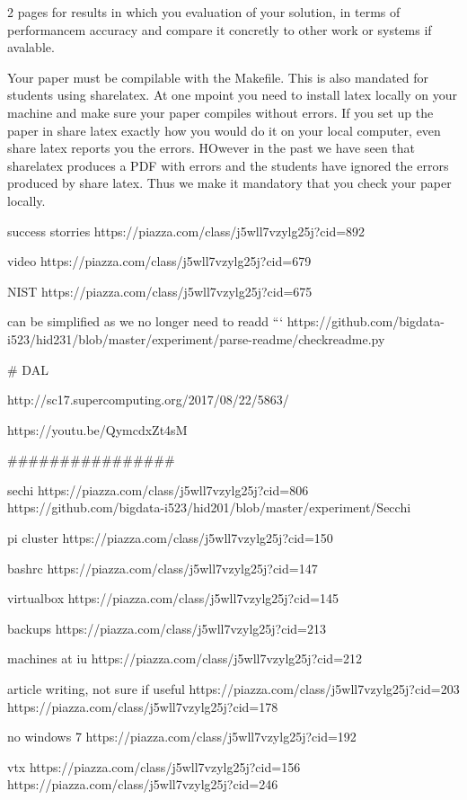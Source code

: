 2 pages for results in which you evaluation of your solution, in terms
of performancem accuracy and compare it concretly to other work or
systems if avalable.

Your paper must be compilable with the Makefile. This is also mandated
for students using sharelatex. At one mpoint you need to install latex
locally on your machine and make sure your paper compiles without
errors. If you set up the paper in share latex exactly how you would
do it on your local computer, even share latex reports you the
errors. HOwever in the past we have seen that sharelatex produces a
PDF with errors and the students have ignored the errors produced by
share latex. Thus we make it mandatory that you check your paper locally.


success storries
https://piazza.com/class/j5wll7vzylg25j?cid=892

video
https://piazza.com/class/j5wll7vzylg25j?cid=679

NIST
https://piazza.com/class/j5wll7vzylg25j?cid=675


can be simplified as we no longer need to readd ```
https://github.com/bigdata-i523/hid231/blob/master/experiment/parse-readme/checkreadme.py



# DAL

http://sc17.supercomputing.org/2017/08/22/5863/

https://youtu.be/QymcdxZt4sM

################


sechi
https://piazza.com/class/j5wll7vzylg25j?cid=806
https://github.com/bigdata-i523/hid201/blob/master/experiment/Secchi%


pi cluster
https://piazza.com/class/j5wll7vzylg25j?cid=150

bashrc
https://piazza.com/class/j5wll7vzylg25j?cid=147

virtualbox
https://piazza.com/class/j5wll7vzylg25j?cid=145

backups
https://piazza.com/class/j5wll7vzylg25j?cid=213

machines at iu
https://piazza.com/class/j5wll7vzylg25j?cid=212

article writing, not sure if useful
https://piazza.com/class/j5wll7vzylg25j?cid=203
https://piazza.com/class/j5wll7vzylg25j?cid=178

no windows 7
https://piazza.com/class/j5wll7vzylg25j?cid=192

vtx
https://piazza.com/class/j5wll7vzylg25j?cid=156
https://piazza.com/class/j5wll7vzylg25j?cid=246



